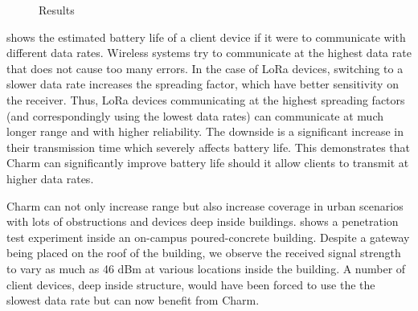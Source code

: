 \begin{figure}[t]
\centering
{}
\hfill
{}
\hfill
{}
\compactimg
\caption{Results}
\label{fig:results}
\compactimg
\end{figure}

 shows the estimated battery life of a client
device if it were to communicate with different data rates. Wireless systems
try to communicate at the highest data rate that does not cause too many
errors. In the case of LoRa devices, switching to a slower data rate increases
the spreading factor,  which have better sensitivity on the receiver. Thus,
LoRa devices communicating at the highest spreading factors (and
correspondingly using the lowest data rates) can communicate at much longer
range and with higher reliability. The downside is a significant increase in
their transmission time which severely affects battery life. This demonstrates
that Charm can significantly improve battery life should it allow clients to
transmit at higher data rates.

Charm can not only increase range but also increase coverage in urban
scenarios with lots of obstructions and devices deep inside buildings.
 shows a penetration test experiment inside an
on-campus poured-concrete building. Despite a gateway being placed on the roof
of the building, we observe the received signal strength to vary as much as 46
dBm at various locations inside the building. A number of client devices, deep
inside structure, would have been forced to use the the slowest data rate but
can now benefit from Charm.

